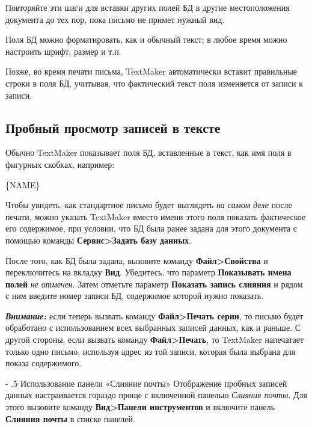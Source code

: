 ﻿\documentclass[a4paper,10pt]{article}
\makeatletter
\renewcommand\paragraph{%
   \@startsection{paragraph}{4}{0mm}%
      {-\baselineskip}%
      {.5\baselineskip}%
      {\normalfont\normalsize\bfseries}}
\makeatother
\begin{document}
Повторяйте эти шаги для вставки других полей БД в другие местоположения документа до тех пор, пока письмо не примет нужный вид.

Поля БД можно форматировать, как и обычный текст; в любое время можно настроить шрифт, размер и т.п.

Позже, во время печати письма, TextMaker автоматически вставит правильные строки в поля БД, учитывая, что фактический текст поля изменяется от записи к записи.

\subsection{Пробный просмотр записей в тексте}
Обычно TextMaker показывает поля БД, вставленные в текст, как имя поля в фигурных скобках, например:

\{NAME\}

Чтобы увидеть, как стандартное письмо будет выглядеть \textit{на самом деле} после печати, можно указать TextMaker вместо имени этого поля показать фактическое его содержимое, при условии, что БД была ранее задана для этого документа с помощью команды \textbf{Сервис>Задать базу данных}.

После того, как БД была задана, вызовите команду \textbf{Файл>Свойства} и переключитесь на вкладку \textbf{Вид}. Убедитесь, что параметр \textbf{Показывать имена полей} \textit{не отмечен}. Затем отметьте параметр \textbf{Показать запись слияния} и рядом с ним введите номер записи БД, содержимое которой нужно показать.

\begin{mdframed}[backgroundcolor=blue!10]
\textbf{\textit{Внимание:}} если теперь вызвать команду \textbf{Файл>Печать серии}, то письмо будет обработано с использованием всех выбранных записей данных, как и раньше. С другой стороны, если вызвать команду \textbf{Файл>Печать}, то TextMaker напечатает только одно письмо, используя адрес из той записи, которая была выбрана для показа содержимого.
\end{mdframed}

\paragraph{Использование панели «Слияние почты»}
Отображение пробных записей данных настраивается гораздо проще с включенной панелью \textit{Слияния почты}. Для этого вызовите команду \textbf{Вид>Панели инструментов} и включите панель \textbf{Слияния почты} в списке панелей.
\end{document}
